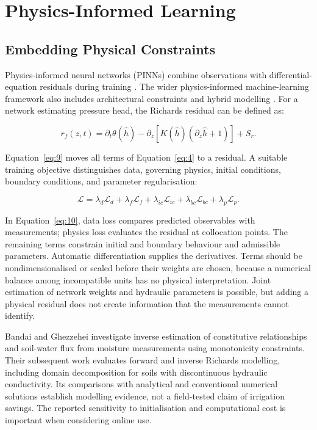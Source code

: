 \documentclass[acmsmall,screen,nonacm]{acmart}
\begin{document}
\section{Physics-Informed Learning}

\label{sec:6}

\subsection{Embedding Physical Constraints}

\label{sec:6-1}

Physics-informed neural networks (PINNs) combine observations with differential-equation residuals during training \cite{R13}. The wider physics-informed machine-learning framework also includes architectural constraints and hybrid modelling \cite{R14}. For a network estimating pressure head, the Richards residual can be defined as:

\begin{equation}
r_f(z,t)=\partial_t\theta(\hat h)-\partial_z\left[K(\hat h)(\partial_z\hat h+1)\right]+S_r.
\label{eq:9}
\end{equation}

Equation~\eqref{eq:9} moves all terms of Equation~\eqref{eq:4} to a residual. A suitable training objective distinguishes data, governing physics, initial conditions, boundary conditions, and parameter regularisation:

\begin{equation}
\mathcal L=\lambda_d\mathcal L_d+\lambda_f\mathcal L_f+\lambda_{ic}\mathcal L_{ic}+\lambda_{bc}\mathcal L_{bc}+\lambda_p\mathcal L_p.
\label{eq:10}
\end{equation}

In Equation~\eqref{eq:10}, data loss compares predicted observables with measurements; physics loss evaluates the residual at collocation points. The remaining terms constrain initial and boundary behaviour and admissible parameters. Automatic differentiation supplies the derivatives. Terms should be nondimensionalised or scaled before their weights are chosen, because a numerical balance among incompatible units has no physical interpretation. Joint estimation of network weights and hydraulic parameters is possible, but adding a physical residual does not create information that the measurements cannot identify.

Bandai and Ghezzehei \cite{R15} investigate inverse estimation of constitutive relationships and soil-water flux from moisture measurements using monotonicity constraints. Their subsequent work \cite{R16} evaluates forward and inverse Richards modelling, including domain decomposition for soils with discontinuous hydraulic conductivity. Its comparisons with analytical and conventional numerical solutions establish modelling evidence, not a field-tested claim of irrigation savings. The reported sensitivity to initialisation and computational cost is important when considering online use.
\end{document}
